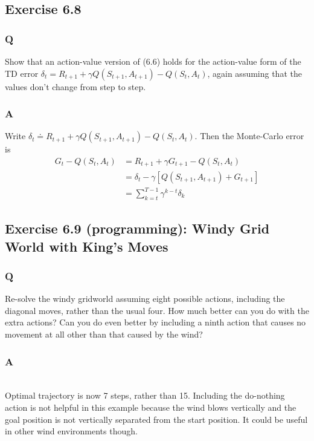 \subsection{Exercise 6.8}
\subsubsection*{Q}
Show that an action-value version of (6.6) holds for the action-value form of the TD error $\delta_t = R_{t+1} + \gamma Q(S_{t+1}, A_{t+1}) - Q(S_t, A_t)$, again assuming that the values don’t change from step to step.
\subsubsection*{A}
Write $\delta_t \doteq R_{t+1} + \gamma Q(S_{t+1}, A_{t+1}) -  Q(S_t, A_t)$. Then the Monte-Carlo error is
\begin{align*}
    G_t - Q(S_t, A_t) &= R_{t+1} + \gamma G_{t+1} - Q(S_t, A_t) \\
                      &= \delta_t - \gamma [Q(S_{t+1}, A_{t+1}) + G_{t+1}]\\
                      &= \sum_{k=t}^{T-1}\gamma^{k-t}\delta_k
\end{align*}

\subsection{Exercise 6.9 (programming): Windy Grid World with King's Moves}
\subsubsection*{Q}
Re-solve the windy gridworld assuming eight possible actions, including the diagonal moves, rather than the usual four. How much better can you do with the extra actions? Can you do even better by including a ninth action that causes no movement at all other than that caused by the wind?

\subsubsection*{A}
\ProgrammingExercise\\

Optimal trajectory is now 7 steps, rather than 15. Including the do-nothing action is not helpful in this example because the wind blows vertically and the goal position is not vertically separated from the start position. It could be useful in other wind environments though.\\

